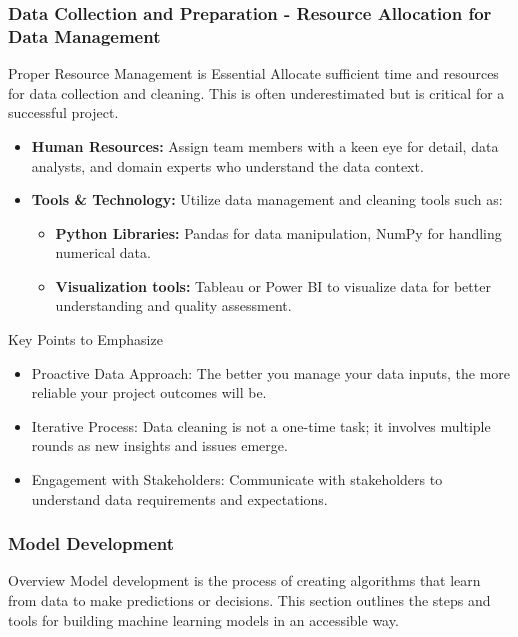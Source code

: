 \documentclass[aspectratio=169]{beamer}
\begin{document}
\begin{frame}[fragile]
  \frametitle{Data Collection and Preparation - Resource Allocation for Data Management}

  \begin{block}{Proper Resource Management is Essential}
    Allocate sufficient time and resources for data collection and cleaning. 
    This is often underestimated but is critical for a successful project.
  \end{block}

  \begin{itemize}
    \item \textbf{Human Resources:}
      Assign team members with a keen eye for detail, data analysts, and domain experts who understand the data context.
      
    \item \textbf{Tools \& Technology:}
      Utilize data management and cleaning tools such as:
      \begin{itemize}
        \item \textbf{Python Libraries:} Pandas for data manipulation, NumPy for handling numerical data.
        \item \textbf{Visualization tools:} Tableau or Power BI to visualize data for better understanding and quality assessment.
      \end{itemize}
  \end{itemize}

  \begin{block}{Key Points to Emphasize}
    \begin{itemize}
      \item Proactive Data Approach: The better you manage your data inputs, the more reliable your project outcomes will be.
      \item Iterative Process: Data cleaning is not a one-time task; it involves multiple rounds as new insights and issues emerge.
      \item Engagement with Stakeholders: Communicate with stakeholders to understand data requirements and expectations.
    \end{itemize}
  \end{block}

\end{frame}

\begin{frame}[fragile]
    \frametitle{Model Development}
    \begin{block}{Overview}
        Model development is the process of creating algorithms that learn from data 
        to make predictions or decisions. This section outlines the steps and tools 
        for building machine learning models in an accessible way.
    \end{block}
\end{frame}
\end{document}
